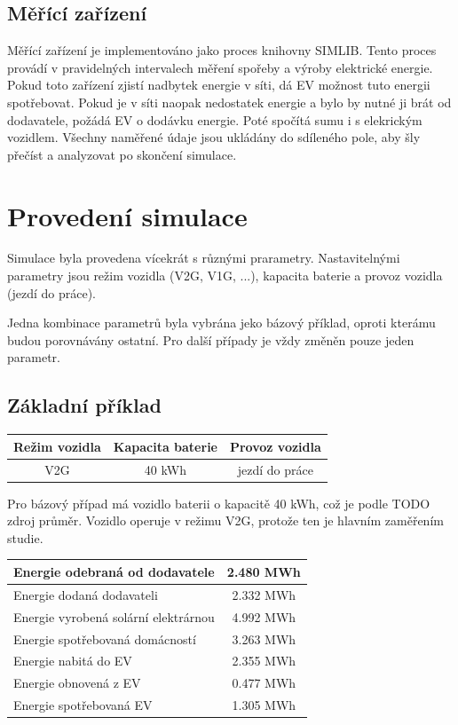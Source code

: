 \documentclass[12pt,a4paper]{article}
\begin{document}
\subsection{Měřící zařízení}
Měřící zařízení je implementováno jako proces knihovny SIMLIB.
Tento proces provádí v pravidelných intervalech měření spořeby a výroby elektrické energie.
Pokud toto zařízení zjistí nadbytek energie v síti, dá EV možnost tuto energii spotřebovat.
Pokud je v síti naopak nedostatek energie a bylo by nutné ji brát od dodavatele, požádá EV o dodávku energie.
Poté spočítá sumu i s elekrickým vozidlem.
Všechny naměřené údaje jsou ukládány do sdíleného pole, aby šly přečíst a analyzovat po skončení simulace.

\section{Provedení simulace}

Simulace byla provedena vícekrát s různými prarametry.
Nastavitelnými parametry jsou režim vozidla (V2G, V1G, ...), kapacita baterie a provoz vozidla (jezdí do práce).

Jedna kombinace parametrů byla vybrána jeko bázový příklad,
oproti kterámu budou porovnávány ostatní.
Pro další případy je vždy změněn pouze jeden parametr.

\subsection{Základní příklad}

\bigskip
\begin{tabular}{ | c | c | c | }
\hline
Režim vozidla & Kapacita baterie & Provoz vozidla \\
\hline
V2G & 40 kWh & jezdí do práce \\
\hline
\end{tabular}
\bigskip

Pro bázový případ má vozidlo baterii o kapacitě 40 kWh, což je podle TODO zdroj průměr.
Vozidlo operuje v režimu V2G, protože ten je hlavním zaměřením studie.

\bigskip
\begin{tabular}{ | l | c | }
\hline
Energie odebraná od dodavatele & 2.480 MWh \\
\hline
Energie dodaná dodavateli & 2.332 MWh \\
\hline
Energie vyrobená solární elektrárnou & 4.992 MWh \\
\hline
Energie spotřebovaná domácností & 3.263 MWh \\
\hline
Energie nabitá do EV & 2.355 MWh \\
\hline
Energie obnovená z EV & 0.477 MWh \\
\hline
Energie spotřebovaná EV & 1.305 MWh \\
\hline
\end{tabular}
\bigskip
\end{document}
